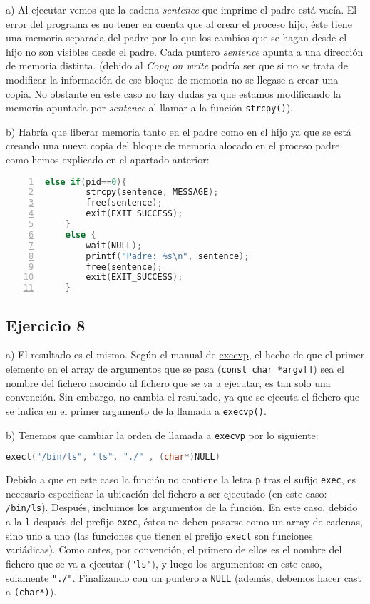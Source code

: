 \documentclass{article}
\begin{document}
a) Al ejecutar vemos que la cadena \textit{sentence} que imprime el padre está vacía. El error del programa es no tener en cuenta que al crear el proceso hijo, éste tiene una memoria separada del padre  por lo que los cambios que se hagan desde el hijo no son visibles desde el padre. Cada puntero \textit{sentence} apunta a una dirección de memoria distinta.
(debido al \textit{Copy on write} podría ser que si no se trata de modificar la información de ese bloque de memoria no se llegase a crear una copia. No obstante en este caso no hay dudas ya que estamos modificando la memoria apuntada por \textit{sentence} al llamar a la función \texttt{strcpy()}).

b) Habría que liberar memoria tanto en el padre como en el hijo ya que se está creando una nueva copia del bloque de memoria alocado en el proceso padre como hemos explicado en el apartado anterior:

\begin{lstlisting}[language=C, numbers=left]
    else if(pid==0){
        strcpy(sentence, MESSAGE);
        free(sentence);
        exit(EXIT_SUCCESS);
    }
    else {
        wait(NULL);
        printf("Padre: %s\n", sentence);
        free(sentence);
        exit(EXIT_SUCCESS);
    }
\end{lstlisting}



\subsection*{Ejercicio 8}

a) El resultado es el mismo. Según el manual de \href{man:execvp(3)}{execvp}, el hecho de que el primer elemento en el array de argumentos que se pasa (\texttt{const char *argv[]}) sea el nombre del fichero asociado al fichero que se va a ejecutar, es tan solo una convención. Sin embargo, no cambia el resultado, ya que se ejecuta el fichero que se indica en el primer argumento de la llamada a \texttt{execvp()}.

b) Tenemos que cambiar la orden de llamada a \texttt{execvp} por lo siguiente:

\begin{lstlisting}[language=C]
    execl("/bin/ls", "ls", "./" , (char*)NULL)
\end{lstlisting}

Debido a que en este caso la función no contiene la letra \texttt{p} tras el sufijo \texttt{exec}, es necesario especificar la ubicación del fichero a ser ejecutado (en este caso: \texttt{/bin/ls}). Después, incluimos los argumentos de la función. En este caso, debido a la \texttt{l} después del prefijo \texttt{exec}, éstos no deben pasarse como un array de cadenas, sino uno a uno (las funciones que tienen el prefijo \texttt{execl} son funciones variádicas). Como antes, por convención, el primero de ellos es el nombre del fichero que se va a ejecutar (\texttt{"ls"}), y luego los argumentos: en este caso, solamente \texttt{"./"}. Finalizando con un puntero a \texttt{NULL} (además, debemos hacer cast a \texttt{(char*)}).
\end{document}
